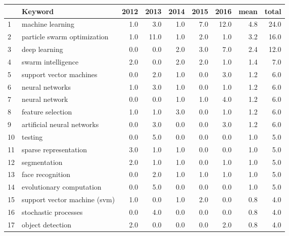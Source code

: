 \begin{tabular}{llrrrrrrr}
\toprule
{} &                            Keyword &  2012 &  2013 &  2014 &  2015 &  2016 &  mean &  total \\
\midrule
1  &                   machine learning &   1.0 &   3.0 &   1.0 &   7.0 &  12.0 &   4.8 &   24.0 \\
2  &        particle swarm optimization &   1.0 &  11.0 &   1.0 &   2.0 &   1.0 &   3.2 &   16.0 \\
3  &                      deep learning &   0.0 &   0.0 &   2.0 &   3.0 &   7.0 &   2.4 &   12.0 \\
4  &                 swarm intelligence &   2.0 &   0.0 &   2.0 &   2.0 &   1.0 &   1.4 &    7.0 \\
5  &            support vector machines &   0.0 &   2.0 &   1.0 &   0.0 &   3.0 &   1.2 &    6.0 \\
6  &                    neural networks &   1.0 &   3.0 &   1.0 &   0.0 &   1.0 &   1.2 &    6.0 \\
7  &                     neural network &   0.0 &   0.0 &   1.0 &   1.0 &   4.0 &   1.2 &    6.0 \\
8  &                  feature selection &   1.0 &   1.0 &   3.0 &   0.0 &   1.0 &   1.2 &    6.0 \\
9  &         artificial neural networks &   0.0 &   3.0 &   0.0 &   0.0 &   3.0 &   1.2 &    6.0 \\
10 &                            testing &   0.0 &   5.0 &   0.0 &   0.0 &   0.0 &   1.0 &    5.0 \\
11 &              sparse representation &   3.0 &   1.0 &   1.0 &   0.0 &   0.0 &   1.0 &    5.0 \\
12 &                       segmentation &   2.0 &   1.0 &   1.0 &   0.0 &   1.0 &   1.0 &    5.0 \\
13 &                   face recognition &   0.0 &   2.0 &   1.0 &   1.0 &   1.0 &   1.0 &    5.0 \\
14 &           evolutionary computation &   0.0 &   5.0 &   0.0 &   0.0 &   0.0 &   1.0 &    5.0 \\
15 &       support vector machine (svm) &   1.0 &   0.0 &   1.0 &   2.0 &   0.0 &   0.8 &    4.0 \\
16 &               stochastic processes &   0.0 &   4.0 &   0.0 &   0.0 &   0.0 &   0.8 &    4.0 \\
17 &                   object detection &   2.0 &   0.0 &   0.0 &   0.0 &   2.0 &   0.8 &    4.0 \\

\end{tabular}
